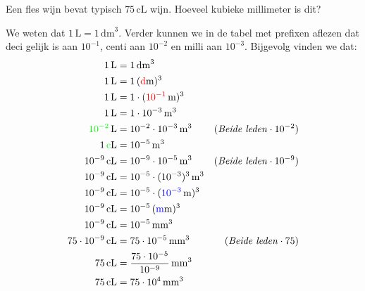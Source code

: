 \documentclass{ximera}
\begin{document}
\begin{example}[foldable=true,title={Voorbeeld: omzetten van cL naar kubieke millimeter}]\nl
    Een fles wijn bevat typisch $75 \, \mathrm{cL}$ wijn. Hoeveel kubieke millimeter is dit?

    \begin{solution}\nl
        We weten dat $1 \, \mathrm{L} = 1 \, \mathrm{dm}^{3}$. Verder kunnen we in de tabel met prefixen aflezen dat deci gelijk is aan $10^{-1}$, centi aan $10^{-2}$ en milli aan $10^{-3}$. Bijgevolg vinden we dat:
        \begin{align*}
        1 \, \mathrm{L} & = 1 \, \mathrm{dm}^{3} & \\
        1 \, \mathrm{L} & = 1\, (\textcolor{red}{\mathrm{d}}\mathrm{m})^{3} & \\
        1 \, \mathrm{L} & = 1 \cdot (\textcolor{red}{10^{-1}} \, \mathrm{m})^{3} & \\
        1 \, \mathrm{L} & = 1 \cdot 10^{-3} \, \mathrm{m}^{3} & \\
        \textcolor{green}{10^{-2}} \, \mathrm{L} & = 10^{-2} \cdot 10^{-3} \, \mathrm{m}^{3} & (\text{\textit{Beide leden}} \cdot 10^{-2}) \\
        1 \, \textcolor{green}{\mathrm{c}}\mathrm{L} & = 10^{-5} \, \mathrm{m}^{3} & \\
        10^{-9} \, \mathrm{cL} & = 10^{-9} \cdot 10^{-5} \, \mathrm{m}^{3} & (\text{\textit{Beide leden}} \cdot 10^{-9}) \\
        10^{-9} \, \mathrm{cL} & = 10^{-5} \cdot (10^{-3})^{3} \, \mathrm{m}^{3} & \\
        10^{-9} \, \mathrm{cL} & = 10^{-5} \cdot (\textcolor{blue}{10^{-3}} \, \mathrm{m})^{3} & \\
        10^{-9} \, \mathrm{cL} & = 10^{-5} \, (\textcolor{blue}{\mathrm{m}}\mathrm{m})^{3} & \\
        10^{-9} \, \mathrm{cL} & = 10^{-5} \, \mathrm{mm}^{3} & \\
        75 \cdot 10^{-9} \, \mathrm{cL} & = 75 \cdot 10^{-5} \, \mathrm{mm}^{3} & (\text{\textit{Beide leden}} \cdot 75) \\
        75 \, \mathrm{cL} & = \frac{75 \cdot 10^{-5}}{10^{-9}} \, \mathrm{mm}^{3} & \\
        75 \, \mathrm{cL} & = 75 \cdot 10^{4} \, \mathrm{mm}^{3} & \\
        \end{align*}
    \end{solution}
\end{example}
\end{document}
